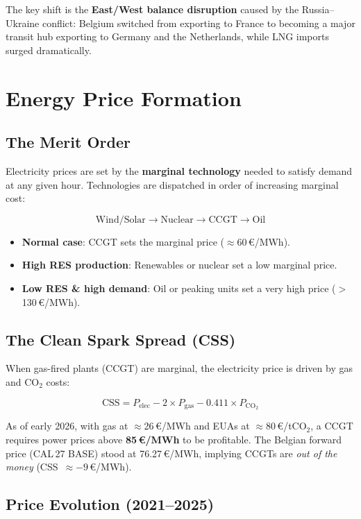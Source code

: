 \noindent The key shift is the \textbf{East/West balance disruption} caused by the Russia–Ukraine conflict: Belgium switched from exporting to France to becoming a major transit hub exporting to Germany and the Netherlands, while LNG imports surged dramatically.

\section{Energy Price Formation}

\subsection*{The Merit Order}

Electricity prices are set by the \textbf{marginal technology} needed to satisfy demand at any given hour. Technologies are dispatched in order of increasing marginal cost:

\[
\text{Wind/Solar} \rightarrow \text{Nuclear} \rightarrow \text{CCGT} \rightarrow \text{Oil}
\]

\begin{itemize}[noitemsep]
    \item \textbf{Normal case}: CCGT sets the marginal price ($\approx$60\,€/MWh).
    \item \textbf{High RES production}: Renewables or nuclear set a low marginal price.
    \item \textbf{Low RES \& high demand}: Oil or peaking units set a very high price ($>$130\,€/MWh).
\end{itemize}

\subsection*{The Clean Spark Spread (CSS)}

When gas-fired plants (CCGT) are marginal, the electricity price is driven by gas and CO$_2$ costs:

\[
\text{CSS} = P_{\text{elec}} - 2 \times P_{\text{gas}} - 0.411 \times P_{\text{CO}_2}
\]

\noindent As of early 2026, with gas at $\approx$26\,€/MWh and EUAs at $\approx$80\,€/tCO$_2$, a CCGT requires power prices above \textbf{85\,€/MWh} to be profitable. The Belgian forward price (CAL\,27 BASE) stood at 76.27\,€/MWh, implying CCGTs are \textit{out of the money} (CSS~$\approx -9$\,€/MWh).

\subsection*{Price Evolution (2021–2025)}

